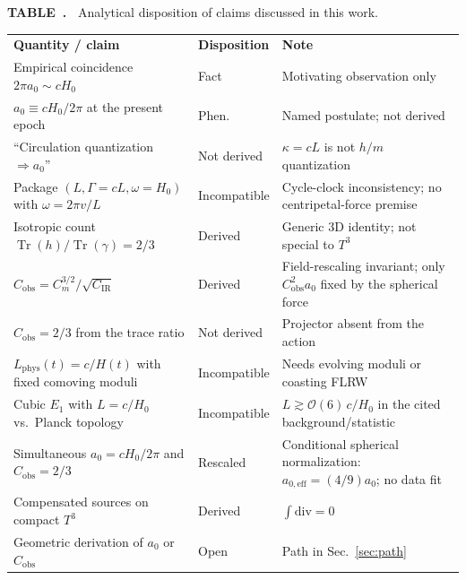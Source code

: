 \documentclass[aps,prd,reprint,superscriptaddress,nofootinbib,floatfix,showkeys]{revtex4-2}
\newcommand{\Tthree}{T^{3}}
\newcommand{\Cobs}{C_{\mathrm{obs}}}
\newcommand{\Cm}{C_{m}}
\newcommand{\CIR}{C_{\mathrm{IR}}}
\newcommand{\azero}{a_{0}}
\newcommand{\Hzero}{H_{0}}
\begin{document}
\onecolumngrid
\vspace{0.9em}
\label{tab:status}
\noindent
\begin{minipage}{\textwidth}
\small
\noindent\textbf{TABLE~\thetable.\ }
Analytical disposition of claims discussed in this work.\\[0.55em]
\begin{ruledtabular}
\begin{tabular}{@{}p{}@{\hspace{0.8em}}p{}@{\hspace{0.8em}}p{}@{}}
\textbf{Quantity / claim} & \textbf{Disposition} & \textbf{Note} \\
\colrule
Empirical coincidence \(2\pi\azero\sim c\Hzero\)
  & Fact & Motivating observation only \\
\hline
\(\azero\equiv c\Hzero/2\pi\) at the present epoch
  & Phen. & Named postulate; not derived \\
\hline
``Circulation quantization \(\Rightarrow\azero\)''
  & Not derived & \(\kappa=cL\) is not \(h/m\) quantization \\
\hline
Package \((L,\Gamma=cL,\omega=\Hzero)\) with \(\omega=2\pi v/L\)
  & Incompatible & Cycle-clock inconsistency; no centripetal-force premise \\
\hline
Isotropic count \(\operatorname{Tr}(h)/\operatorname{Tr}(\gamma)=2/3\)
  & Derived & Generic 3D identity; not special to \(\Tthree\) \\
\hline
\(\Cobs=\Cm^{3/2}/\sqrt{\CIR}\)
  & Derived & Field-rescaling invariant; only \(\Cobs^2\azero\) fixed by the spherical force \\
\hline
\(\Cobs=2/3\) from the trace ratio
  & Not derived & Projector absent from the action \\
\hline
\(L_{\mathrm{phys}}(t)=c/H(t)\) with fixed comoving moduli
  & Incompatible & Needs evolving moduli or coasting FLRW \\
\hline
Cubic \(E_1\) with \(L=c/\Hzero\) vs.\ Planck topology
  & Incompatible & \(L\gtrsim\mathcal{O}(6)\,c/\Hzero\) in the cited background/statistic \\
\hline
Simultaneous \(\azero=c\Hzero/2\pi\) and \(\Cobs=2/3\)
  & Rescaled & Conditional spherical normalization: \(a_{0,\mathrm{eff}}=(4/9)\azero\); no data fit \\
\hline
Compensated sources on compact \(\Tthree\)
  & Derived & \(\int\mathrm{div}=0\) \\
\hline
Geometric derivation of \(\azero\) or \(\Cobs\)
  & Open & Path in Sec.~\ref{sec:path} \\
\end{tabular}
\end{ruledtabular}
\end{minipage}
\vspace{1.0em}
\twocolumngrid
\end{document}
